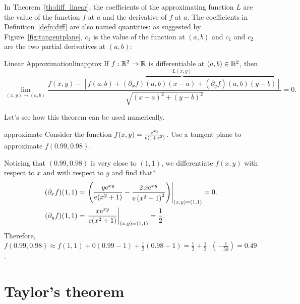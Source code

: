 \documentclass{watsonbook}
\begin{document}
In Theorem~\ref{th:diff_linear}, the coefficients of the
approximating function $L$ are the value of the function $f$ at $a$
and the derivative of $f$ at $a$. The coefficients in
Definition~\ref{defn:diff} are also named quantities: as suggested
by Figure~\ref{fig:tangentplane}, $c_1$ is the value of the function
at $(a,b)$ and $c_1$ and $c_2$ are the two partial derivatives at
$(a,b)$:

\vspace{12pt} 

\begin{theo}{Linear Approximation}{linapprox}
  If $f: \mathbb{R}^2 \to \mathbb{R}$ is differentiable at $(a,b) \in \mathbb{R}^2$, then
  \[
    \lim_{(x,y) \to (a,b)}\frac{f(x,y) - \overbrace{\left[f(a,b) + (\partial_x
          f)(a,b)(x-a) + (\partial_y
          f)(a,b)(y-b)\right]}^{L(x,y)}}{\sqrt{(x-a)^2 + (y-b)^2}} = 0.
  \]
\end{theo} \bang{-2cm} 

Let's see how this theorem can be used numerically. 

\begin{example}{}{approximate}
  Consider the function $f(x,y) = \frac{\mathrm{e}^{xy}}{\mathrm{e}(1+x^2)}$. Use a
  tangent plane to approximate $f(0.99,0.98)$.
\end{example}

\begin{solution}
  Noticing that $(0.99,0.98)$ is very close to $(1,1)$, we
  differentiate $f(x,y)$ with respect to $x$ and with respect to $y$ and
  find that* 
  \begin{align*}
    (\partial_x f)(1,1) &= \left.\left(
                          \frac{y \mathrm{e}^{x y}}{\mathrm{e}(x^{2} + 1)} -
                          \frac{2 \, x \mathrm{e}^{xy}}{{\mathrm{e}\left(x^{2} +
                          1\right)}^{2}}\right)\right|_{(x,y)
                          =(1,1)} = 0. \\
    (\partial_y f)(1,1) &=    \left.\frac{x \mathrm{e}^{x y}}{\mathrm{e}(x^{2} +
                          1)}\right|_{(x,y) = (1,1)} = \frac{1}{2}. 
  \end{align*}
  Therefore, $f(0.99,0.98) \approx f(1,1) + 0(0.99-1) +
  \frac{1}{2}(0.98-1) = \frac{1}{2} + \frac{1}{2} \cdot
  (-\frac{1}{50}) = 0.49$.  
\end{solution}

\section{Taylor's theorem} \label{sec:taylor}
\end{document}
